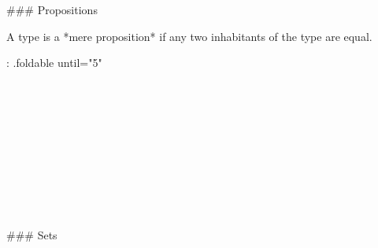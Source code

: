 ### Propositions

A type is a *mere proposition* if any two inhabitants of the type are equal.

{: .foldable until="5"}
\begin{code}%
\>[0]\<%
\\
\>[0]\<%
\\
\>[0][@{}l@{\AgdaIndent{0}}]%
\>[2]\AgdaSymbol{:}\AgdaSpace{}%
\AgdaSpace{}%
\AgdaSymbol{\{}\AgdaSymbol{\}}\AgdaSpace{}%
\AgdaSymbol{(}\AgdaSpace{}%
\AgdaSymbol{:}\AgdaSpace{}%
\AgdaSpace{}%
\AgdaSymbol{)}\AgdaSpace{}%
\AgdaSpace{}%
\AgdaSpace{}%
\<%
\\
%
\\[\AgdaEmptyExtraSkip]%
\>[0]\AgdaSpace{}%
\AgdaSpace{}%
\AgdaSymbol{=}\AgdaSpace{}%
\AgdaSymbol{((}\AgdaSpace{}%
\AgdaSpace{}%
\AgdaSymbol{:}\AgdaSpace{}%
\AgdaSymbol{)}\AgdaSpace{}%
\AgdaSpace{}%
\AgdaSpace{}%
\AgdaOperator{\AgdaDatatype{==}}\AgdaSpace{}%
\AgdaSymbol{)}\<%
\end{code}

\begin{code}%
\>[0]\AgdaSpace{}%
\AgdaSymbol{=}\AgdaSpace{}%
\<%
\end{code}

\begin{code}%
\>[0]\<%
\\
\>[0]\<%
\\
\>[0][@{}l@{\AgdaIndent{0}}]%
\>[2]\AgdaSymbol{:}\AgdaSpace{}%
\AgdaSpace{}%
\AgdaSymbol{\{}\AgdaSymbol{\}}\AgdaSpace{}%
\AgdaSpace{}%
\AgdaSpace{}%
\AgdaSymbol{(}\AgdaSpace{}%
\AgdaSymbol{)}\<%
\\
%
\\[\AgdaEmptyExtraSkip]%
\>[0]\AgdaSpace{}%
\AgdaSymbol{\{}\AgdaSymbol{\}}\AgdaSpace{}%
\AgdaSymbol{=}\AgdaSpace{}%
\AgdaSpace{}%
\AgdaSymbol{(}\AgdaSpace{}%
\AgdaSymbol{)}\AgdaSpace{}%
\<%
\end{code}

### Sets


